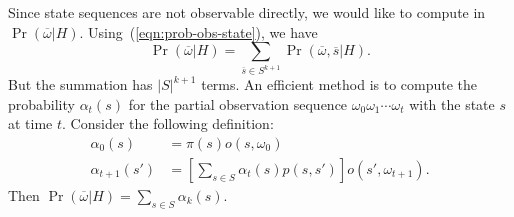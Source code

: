 Since state sequences are not observable directly, we would like to
compute in $\Pr (\overline{\omega} |
H)$. Using~(\ref{eqn:prob-obs-state}), we have
\[
  \Pr (\overline{\omega} | H) = \sum_{\overline{s} \in S^{k+1}}
  \Pr (\overline{\omega}, \overline{s} | H).
\]
But the summation has $|S|^{k+1}$ terms. An efficient method is to
compute the probability $\alpha_t (s)$ for the partial observation
sequence $\omega_0\omega_1\cdots\omega_t$ with the state $s$ at time
$t$. Consider the following definition:
\begin{align*}
  \alpha_0 (s) &= \pi(s) o (s, \omega_0)\\
  \alpha_{t+1} (s') &= \left[
                      \sum_{s \in S} \alpha_t (s) p (s, s')
                      \right]
                      o (s', \omega_{t+1}).
\end{align*}
Then $\Pr (\overline{\omega} | H) = \sum_{s \in S} \alpha_k (s)$.